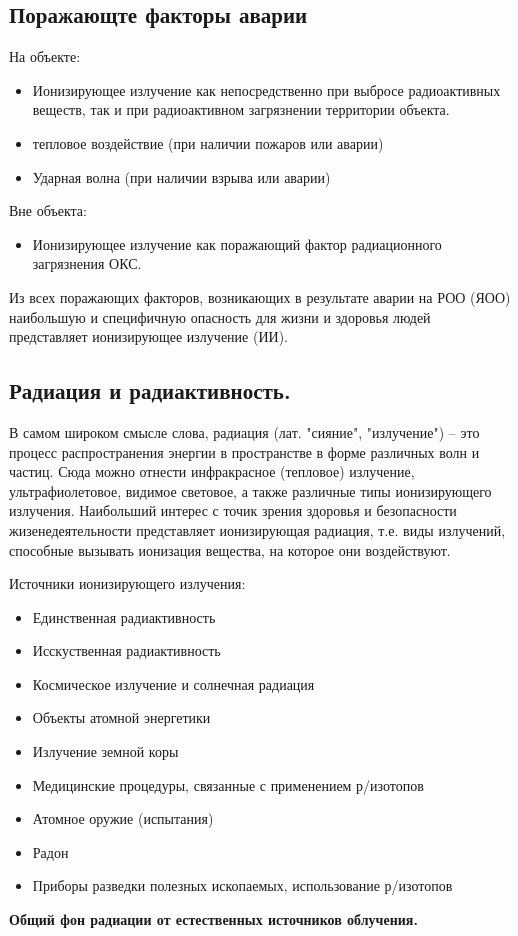 \documentclass[a4paper, 12pt]{article}
\theoremstyle{definition}
\begin{document}
        \subsection{Поражающте факторы аварии}
        На объекте: 
        \begin{itemize}
            \item Ионизирующее излучение как непосредственно при выбросе радиоактивных веществ, так и при радиоактивном загрязнении территории объекта.
            \item тепловое воздействие (при наличии пожаров или аварии)
            \item Ударная волна (при наличии взрыва или аварии)
        \end{itemize}
        Вне объекта:
        \begin{itemize}
            \item Ионизирующее излучение как поражающий фактор радиационного загрязнения ОКС.
        \end{itemize}
        Из всех поражающих факторов, возникающих в результате аварии на РОО (ЯОО) наибольшую и специфичную опасность для жизни и здоровья людей представляет ионизирующее излучение (ИИ).
        \subsection{Радиация и радиактивность.}
        В самом широком смысле слова, радиация (лат. "сияние", "излучение") -- это процесс распространения энергии в пространстве в форме различных волн и частиц. Сюда можно отнести инфракрасное (тепловое) излучение, ультрафиолетовое, видимое световое, а также различные типы ионизирующего излучения. Наибольший интерес с точик зрения здоровья и безопасности жизенедеятельности представляет ионизирующая радиация, т.е. виды излучений, способные вызывать ионизация вещества, на которое они воздействуют.

        Источники ионизирующего излучения: 
        \begin{itemize}
            \item Единственная радиактивность
            \item Исскуственная радиактивность
            \item Космическое излучение и солнечная радиация
            \item Объекты атомной энергетики
            \item Излучение земной коры
            \item Медицинские процедуры, связанные с применением р/изотопов
            \item Атомное оружие (испытания)
            \item Радон
            \item Приборы разведки полезных ископаемых, использование р/изотопов
        \end{itemize}
        \begin{center}
            \textbf{Общий фон радиации от естественных источников облучения.} 
        \end{center}
\end{document}

